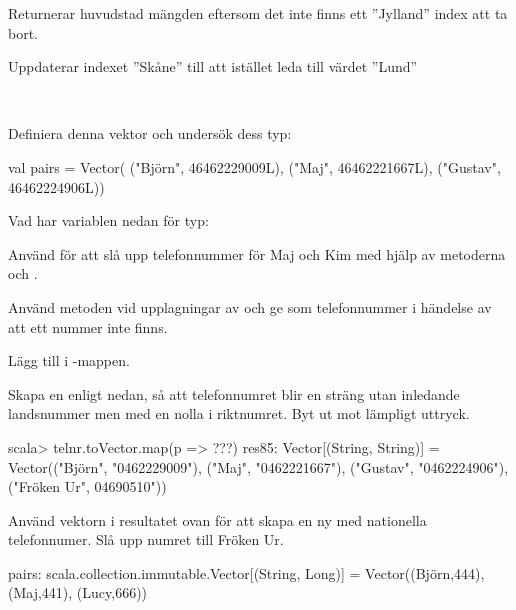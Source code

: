 {{\SubtaskSolved
Returnerar huvudstad mängden eftersom det inte finns ett ''Jylland'' index att ta bort.

\SubtaskSolved
Uppdaterar indexet ''Skåne'' till att istället leda till värdet ''Lund''


\QUESTEND









\QUESTBEGIN

\Task  \what~

\Subtask Definiera denna vektor och undersök dess typ:
\begin{Code}
val pairs = Vector(
  ("Björn", 46462229009L),
  ("Maj", 46462221667L),
  ("Gustav", 46462224906L))
\end{Code}

\Subtask Vad har variablen  nedan för typ: \\ 

\Subtask Använd  för att slå upp telefonnummer för Maj och Kim med hjälp av metoderna  och .

\Subtask Använd metoden  vid upplagningar av  och ge  som telefonnummer i händelse av att ett nummer inte finns.

\Subtask Lägg till  i -mappen.

\Subtask Skapa en  enligt nedan, så att telefonnumret blir en sträng utan inledande landsnummer men med en nolla i riktnumret. Byt ut  mot lämpligt uttryck.
\begin{REPL}
scala> telnr.toVector.map(p => ???)
res85: Vector[(String, String)] = Vector(("Björn", "0462229009"), ("Maj",
"0462221667"), ("Gustav", "0462224906"), ("Fröken Ur", 04690510"))

\end{REPL}

\Subtask Använd vektorn i resultatet ovan för att skapa en ny  med nationella telefonnumer. Slå upp numret till Fröken Ur.

\SOLUTION


\TaskSolved \what


\SubtaskSolved
\begin{REPLnonum}
pairs: scala.collection.immutable.Vector[(String, Long)] =
					Vector((Björn,444), (Maj,441), (Lucy,666))
\end{REPLnonum}

}}
